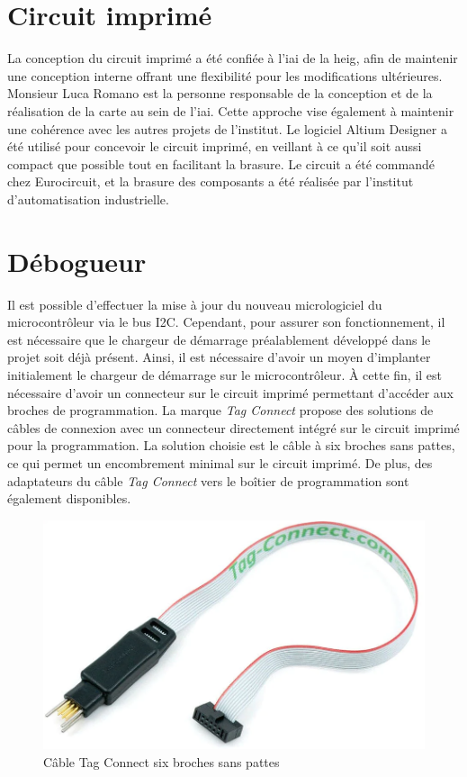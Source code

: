 \section{Circuit imprimé}

La conception du circuit imprimé a été confiée à l'\gls{iai} de la \gls{heig}, afin de maintenir une conception interne offrant une flexibilité pour les modifications ultérieures.
Monsieur Luca Romano est la personne responsable de la conception et de la réalisation de la carte au sein de l'\gls{iai}. Cette approche vise également à maintenir une cohérence avec les autres projets de l'institut.
Le logiciel Altium Designer a été utilisé pour concevoir le circuit imprimé, en veillant à ce qu'il soit aussi compact que possible tout en facilitant la brasure.
Le circuit a été commandé chez Eurocircuit, et la brasure des composants a été réalisée par l'institut d'automatisation industrielle.

\section{Débogueur}

Il est possible d'effectuer la mise à jour du nouveau micrologiciel du microcontrôleur via le bus I2C.
Cependant, pour assurer son fonctionnement, il est nécessaire que le chargeur de démarrage préalablement développé dans le projet soit déjà présent.
Ainsi, il est nécessaire d'avoir un moyen d'implanter initialement le chargeur de démarrage sur le microcontrôleur.
À cette fin, il est nécessaire d'avoir un connecteur sur le circuit imprimé permettant d'accéder aux broches de programmation.
La marque \textit{Tag Connect} propose des solutions de câbles de connexion avec un connecteur directement intégré sur le circuit imprimé pour la programmation.
La solution choisie est le câble à six broches sans pattes, ce qui permet un encombrement minimal sur le circuit imprimé.
De plus, des adaptateurs du câble \textit{Tag Connect} vers le boîtier de programmation sont également disponibles.

\begin{figure}[H]
    \centering
    \includegraphics[scale=0.2]{./assets/figures/tag_connect.png}
    \caption{\cite{tag_connect} Câble Tag Connect six broches sans pattes}
\end{figure}

